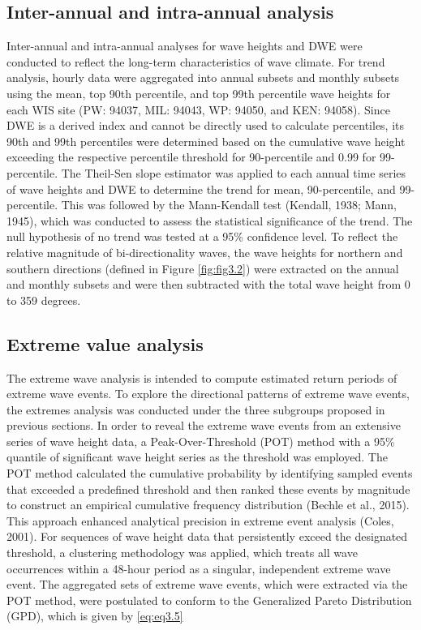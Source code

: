 \subsection{Inter-annual and intra-annual analysis}
\label{c3_Inter-annual and intra-annual analysis}
Inter-annual and intra-annual analyses for wave heights and DWE were conducted to reflect the long-term characteristics of wave climate. For trend analysis, hourly data were aggregated into annual subsets and monthly subsets using the mean, top 90th percentile, and top 99th percentile wave heights for each WIS site (PW: 94037, MIL: 94043, WP: 94050, and KEN: 94058). Since DWE is a derived index and cannot be directly used to calculate percentiles, its 90th and 99th percentiles were determined based on the cumulative wave height exceeding the respective percentile threshold for 90-percentile and 0.99 for 99-percentile. The Theil-Sen slope estimator was applied to each annual time series of wave heights and DWE to determine the trend for mean, 90-percentile, and 99-percentile. This was followed by the Mann-Kendall test (Kendall, 1938; Mann, 1945), which was conducted to assess the statistical significance of the trend. The null hypothesis of no trend was tested at a 95\% confidence level. To reflect the relative magnitude of bi-directionality waves, the wave heights for northern and southern directions (defined in Figure \ref{fig:fig3.2}) were extracted on the annual and monthly subsets and were then subtracted with the total wave height from 0 to 359 degrees.

\subsection{Extreme value analysis}
\label{c3_Extreme value analysis}
The extreme wave analysis is intended to compute estimated return periods of extreme wave events. To explore the directional patterns of extreme wave events, the extremes analysis was conducted under the three subgroups proposed in previous sections. In order to reveal the extreme wave events from an extensive series of wave height data, a Peak-Over-Threshold (POT) method with a 95\% quantile of significant wave height series as the threshold was employed. The POT method calculated the cumulative probability by identifying sampled events that exceeded a predefined threshold and then ranked these events by magnitude to construct an empirical cumulative frequency distribution (Bechle et al., 2015). This approach enhanced analytical precision in extreme event analysis (Coles, 2001). For sequences of wave height data that persistently exceed the designated threshold, a clustering methodology was applied, which treats all wave occurrences within a 48-hour period as a singular, independent extreme wave event. The aggregated sets of extreme wave events, which were extracted via the POT method, were postulated to conform to the Generalized Pareto Distribution (GPD), which is given by \ref{eq:eq3.5}

